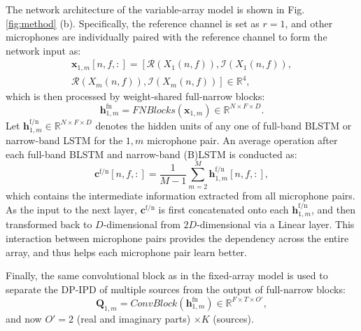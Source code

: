 \documentclass[lettersize,journal]{IEEEtran}
\begin{document}
The network architecture of the variable-array model is shown in Fig. \ref{fig:method} (b). Specifically, the reference channel is set as $r=1$, and other microphones are individually paired with the reference channel to form the network input as: 
\begin{equation}
\begin{aligned}
\mathbf{x}_{1,m}[n, f,:]=\left[\mathcal{R}\left(X_1(n, f)\right), \mathcal{I}\left(X_1(n, f)\right),\right. \\
\left.\mathcal{R}\left(X_m(n, f)\right), \mathcal{I}\left(X_m(n, f)\right)\right] \in \mathbb{R}^{4},
\end{aligned}
\end{equation}
which is then processed by weight-shared full-narrow blocks:
\begin{equation}
    \mathbf{h}^{\text{fn}}_{1,m} = FNBlocks(\mathbf{x}_{1,m})\in \mathbb{R}^{N\times F \times D}.
\end{equation}
Let $\mathbf{h}^{\text{f/n}}_{1, m} \in \mathbb{R}^{N\times F \times D} $ denotes the hidden units of any one of full-band BLSTM or narrow-band LSTM for the $1,m$ microphone pair.
An average operation after each full-band BLSTM and narrow-band (B)LSTM is conducted as:
\begin{equation}
\mathbf{c}^{\text{f/n}}[n,f,:] =\frac{1}{M-1} \sum_{m=2}^{M} \mathbf{h}^{\text{f/n}}_{1,m}[n,f,:],
\end{equation}
which contains the intermediate information extracted from all microphone pairs.  As the input to the next layer, $\mathbf{c}^{\text{f/n}}$ is first concatenated onto each $\mathbf{h}^{\text{f/n}}_{1, m}$, and then transformed back to $D$-dimensional from $2D$-dimensional via a Linear layer. This interaction between microphone pairs provides the dependency across the entire array, and thus helps each microphone pair learn better. 

Finally, the same convolutional block as in the fixed-array model is used to separate the DP-IPD of multiple sources from the output of full-narrow blocks:
\begin{equation}
    \mathbf{Q}_{1,m} = ConvBlock(\mathbf{h}_{1,m}^{\text{fn}})\in \mathbb{R}^{F\times T \times O'},
\end{equation}
and now $O'=2$ (real and imaginary parts) $\times K$ (sources). 
\end{document}
